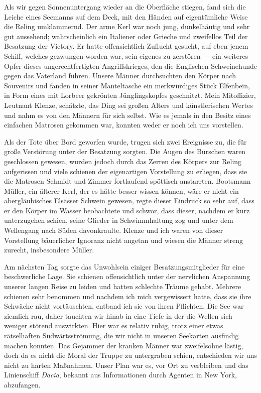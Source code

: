 \documentclass[a4paper]{memoir}
\begin{document}
Als wir gegen Sonnenuntergang wieder an die Oberfläche stiegen, fand sich die Leiche eines Seemanns auf dem Deck, mit den Händen auf eigentümliche Weise die Reling umklammernd. Der arme Kerl war noch jung, dunkelhäutig und sehr gut aussehend; wahrscheinlich ein Italiener oder Grieche und zweifellos Teil der Besatzung der Victory. Er hatte offensichtlich Zuflucht gesucht, auf eben jenem Schiff, welches gezwungen worden war, sein eigenes zu zerstören --- ein weiteres Opfer dieses ungerechtfertigten Angriffskrieges, den die Englischen Schweinehunde gegen das Vaterland führen. Unsere Männer durchsuchten den Körper nach Souvenirs und fanden in seiner Manteltasche ein merkwürdiges Stück Elfenbein, in Form eines mit Lorbeer gekrönten Jünglingskopfes geschnitzt.
Mein Mitoffizier, Leutnant Klenze, schätzte, das Ding sei großen Alters und künstlerischen Wertes und nahm es von den Männern für sich selbst. Wie es jemals in den Besitz eines einfachen Matrosen gekommen war, konnten weder er noch ich uns vorstellen.

Als der Tote über Bord geworfen wurde, trugen sich zwei Ereignisse zu, die für große Verstörung unter der Besatzung sorgten. Die Augen des Burschen waren geschlossen gewesen, wurden jedoch durch das Zerren des Körpers zur Reling aufgerissen und viele schienen der eigenartigen Vorstellung zu erliegen, dass sie die Matrosen Schmidt und Zimmer fortlaufend spöttisch anstarrten. Bootsmann Müller, ein älterer Kerl, der es hätte besser wissen können, wäre er nicht ein abergläubisches Elsässer Schwein gewesen, regte dieser Eindruck so sehr auf, dass er den Körper im Wasser beobachtete und schwor, dass dieser, nachdem er kurz unterzugehen schien, seine Glieder in Schwimmhaltung zog und unter dem Wellengang nach Süden davonkraulte. Klenze und ich waren von dieser Vorstellung bäuerlicher Ignoranz nicht angetan und wiesen die Männer streng zurecht, insbesondere Müller.

Am nächsten Tag sorgte das Unwohlsein einiger Besatzungsmitglieder für eine beschwerliche Lage. Sie schienen offensichtlich unter der nervlichen Anspannung unserer langen Reise zu leiden und hatten schlechte Träume gehabt. Mehrere schienen sehr benommen und nachdem ich mich vergewissert hatte, dass sie ihre Schwäche nicht vortäuschten, entband ich sie von ihren Pflichten.
Die See war ziemlich rau, daher tauchten wir hinab in eine Tiefe in der die Wellen sich weniger störend auswirkten. Hier war es relativ ruhig, trotz einer etwas rätselhaften Südwärtsströmung, die wir nicht in unseren Seekarten ausfindig machen konnten. Das Gejammer der kranken Männer war zweifelsohne lästig, doch da es nicht die Moral der Truppe zu untergraben schien, entschieden wir uns nicht zu harten Maßnahmen. Unser Plan war es, vor Ort zu verbleiben und das Linienschiff \textit{Dacia}, bekannt aus Informationen durch Agenten in New York, abzufangen.
\end{document}
